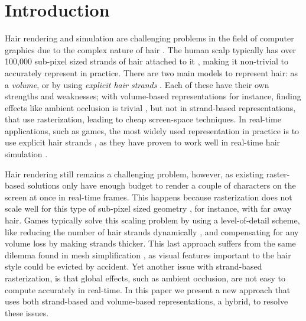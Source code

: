 \documentclass{egpubl}
\begin{document}
\section{Introduction} \label{sec:introduction}


Hair rendering and simulation are challenging problems in the field of computer graphics due to the complex nature of hair \cite{ward2007survey}. The human scalp typically has over 100,000 sub-pixel sized strands of hair attached to it \cite{ward2007survey}, making it non-trivial to accurately represent in practice. There are two main models to represent hair: as a \emph{volume}, or by using \emph{explicit hair strands} \cite{ward2007survey}. Each of these have their own strengths and weaknesses; with volume-based representations for instance, finding effects like ambient occlusion is trivial \cite{hernell2010local}, but not in strand-based representations, that use rasterization, leading to cheap screen-space techniques. In real-time applications, such as games, the most widely used representation in practice is to use explicit hair strands \cite{nguyen2005hair, yuksel2010advanced, martin2014tressfx}, as they have proven to work well in real-time hair simulation \cite{han2014hair}.


Hair rendering still remains a challenging problem, however, as existing raster-based solutions \cite{nguyen2005hair, martin2014tressfx} only have enough budget to render a couple of characters on the screen at once in real-time frames. This happens because rasterization does not scale well for this type of sub-pixel sized geometry \cite{riccio2014triangles}, for instance, with far away hair. Games typically solve this scaling problem by using a level-of-detail scheme, like reducing the number of hair strands dynamically \cite{yuksel2010advanced, steward2015augmented}, and compensating for any volume loss by making strands thicker. This last approach suffers from the same dilemma found in mesh simplification \cite{cignoni1998comparison}, as visual features important to the hair style could be evicted by accident. Yet another issue with strand-based rasterization, is that global effects, such as ambient occlusion, are not easy to compute accurately in real-time. In this paper we present a new approach that uses both strand-based and volume-based representations, a hybrid, to resolve these issues.
\end{document}
